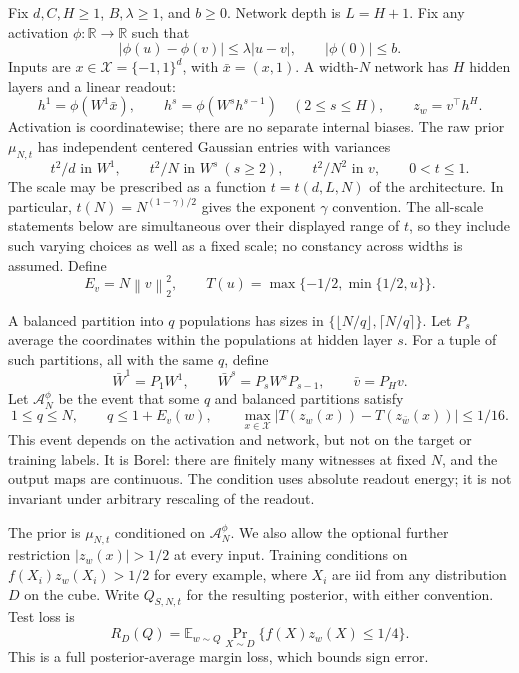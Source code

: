 \documentclass[11pt]{article}
\newcommand{\R}{\mathbb R}
\newcommand{\E}{\mathbb E}
\newcommand{\norm}[1]{\left\lVert#1\right\rVert}
\begin{document}
Fix $d,C,H\ge1$, $B,\lambda\ge1$, and $b\ge0$. Network depth is $L=H+1$.
Fix any activation $\phi:\R\to\R$ such that
\begin{equation}\label{eq:activation}
 |\phi(u)-\phi(v)|\le\lambda|u-v|,\qquad |\phi(0)|\le b.
\end{equation}
Inputs are $x\in\mathcal X=\{-1,1\}^d$, with $\bar x=(x,1)$.
A width-$N$ network has $H$ hidden layers and a linear readout:
\[
 h^1=\phi(W^1\bar x),\qquad h^s=\phi(W^sh^{s-1})\quad(2\le s\le H),
 \qquad z_w=v^\top h^H.
\]
Activation is coordinatewise; there are no separate internal biases.
The raw prior $\mu_{N,t}$ has independent centered Gaussian entries with
variances
\begin{equation}\label{eq:prior}
 t^2/d\text{ in }W^1,\qquad t^2/N\text{ in }W^s\ (s\ge2),
 \qquad t^2/N^2\text{ in }v,\qquad 0<t\le1.
\end{equation}
The scale may be prescribed as a function $t=t(d,L,N)$ of the
architecture. In particular, $t(N)=N^{(1-\gamma)/2}$ gives the exponent
$\gamma$ convention. The all-scale statements below are simultaneous
over their displayed range of $t$, so they include such varying choices
as well as a fixed scale; no constancy across widths is assumed. Define
\[
 E_v=N\norm v_2^2,\qquad T(u)=\max\{-1/2,\min\{1/2,u\}\}.
\]

A balanced partition into $q$ populations has sizes in
$\{\lfloor N/q\rfloor,\lceil N/q\rceil\}$. Let $P_s$ average the
coordinates within the populations at hidden layer $s$. For a tuple of
such partitions, all with the same $q$, define
\begin{equation}\label{eq:merged}
 \bar W^1=P_1W^1,\qquad \bar W^s=P_sW^sP_{s-1},\qquad \bar v=P_Hv.
\end{equation}
Let $\mathcal A_N^\phi$ be the event that some $q$ and balanced partitions
satisfy
\begin{equation}\label{eq:support}
 1\le q\le N,\qquad q\le1+E_v(w),\qquad
 \max_{x\in\mathcal X}|T(z_w(x))-T(z_{\bar w}(x))|\le1/16.
\end{equation}
This event depends on the activation and network, but not on the target
or training labels. It is Borel: there are finitely many witnesses at
fixed $N$, and the output maps are continuous. The condition uses absolute
readout energy; it is not invariant under arbitrary rescaling of the readout.

The prior is $\mu_{N,t}$ conditioned on $\mathcal A_N^\phi$. We also allow
the optional further restriction $|z_w(x)|>1/2$ at every input. Training
conditions on $f(X_i)z_w(X_i)>1/2$ for every example, where $X_i$ are iid
from any distribution $D$ on the cube. Write $Q_{S,N,t}$ for the resulting
posterior, with either convention. Test loss is
\[
 R_D(Q)=\E_{w\sim Q}\Pr_{X\sim D}\{f(X)z_w(X)\le1/4\}.
\]
This is a full posterior-average margin loss, which bounds sign error.
\end{document}
